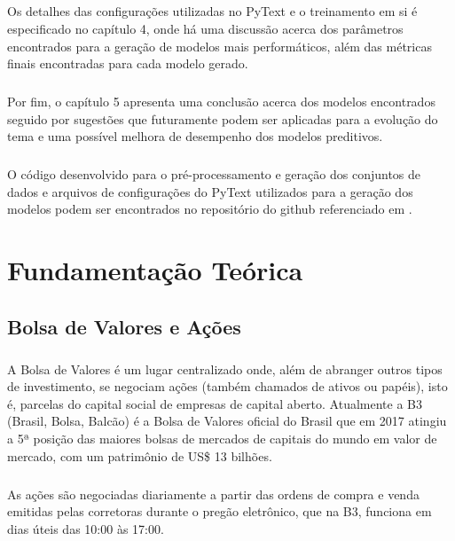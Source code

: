 \documentclass[grad,numbers]{coppe}
\begin{document}
			\paragraph{}Os detalhes das configurações utilizadas no PyText e o treinamento em si é especificado no capítulo 4, onde há uma discussão acerca dos parâmetros encontrados para a geração de modelos mais performáticos, além das métricas finais encontradas para cada modelo gerado.
			\paragraph{}Por fim, o capítulo 5 apresenta uma conclusão acerca dos modelos encontrados seguido por sugestões que futuramente podem ser aplicadas para a evolução do tema e uma possível melhora de desempenho dos modelos preditivos.
			\paragraph{}O código desenvolvido para o pré-processamento e geração dos conjuntos de dados e arquivos de configurações do PyText utilizados para a geração dos modelos podem ser encontrados no repositório do github referenciado em \cite{github}.
   
  \chapter{Fundamentação Teórica}
  
  \section{Bolsa de Valores e Ações}
  	\paragraph{}A Bolsa de Valores é um lugar centralizado onde, além de abranger outros tipos de investimento, se negociam ações (também chamados de ativos ou papéis), isto é, parcelas do capital social de empresas de capital aberto. Atualmente a B3 (Brasil, Bolsa, Balcão) é a Bolsa de Valores oficial do Brasil que em 2017 atingiu a 5ª posição das maiores bolsas de mercados de capitais do mundo em valor de mercado, com um patrimônio de US\$ 13 bilhões\cite{b3-patrimonio}.
  	\paragraph{}As ações são negociadas diariamente a partir das ordens de compra e venda emitidas pelas corretoras durante o pregão eletrônico, que na B3, funciona em dias úteis das 10:00 às 17:00.
\end{document}
